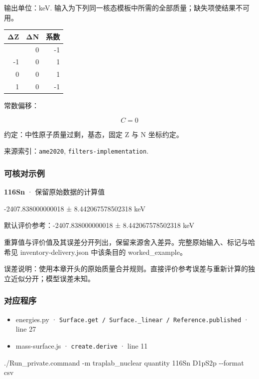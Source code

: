\documentclass[
  11pt,
  letterpaper,
]{article}
\newenvironment{Shaded}{}{}
\newcommand{\AttributeTok}[1]{\textcolor[rgb]{0.49,0.56,0.16}{#1}}
\newcommand{\ExtensionTok}[1]{#1}
\newcommand{\NormalTok}[1]{#1}
\providecommand{\tightlist}{%
  \setlength{\itemsep}{0pt}\setlength{\parskip}{0pt}}
\begin{document}
输出单位：keV.
输入为下列同一核态模板中所需的全部质量；缺失项使结果不可用。

\begin{longtable}[]{@{}rrr@{}}
\toprule\noalign{}
ΔZ & ΔN & 系数 \\
\midrule\noalign{}
\endhead
\bottomrule\noalign{}
\endlastfoot
-2 & 0 & -1 \\
-1 & 0 & 1 \\
0 & 0 & 1 \\
1 & 0 & -1 \\
\end{longtable}

常数偏移：

\[
C=0
\]

约定：中性原子质量过剩，基态，固定 Z 与 N 坐标约定。

来源索引：\texttt{ame2020}, \texttt{filters-implementation}.

\subsubsection{可核对示例}\label{ux53efux6838ux5bf9ux793aux4f8b-31}

\textbf{116Sn} · 保留原始数据的计算值

-2407.838000000018 ± 8.442067578502318 keV

默认评价参考：-2407.838000000018 ± 8.442067578502318 keV

重算值与评价值及其误差分开列出，保留来源舍入差异。完整原始输入、标记与哈希见
inventory-delivery.json 中该条目的 worked\_example。

误差说明：使用本章开头的原始质量合并规则。直接评价参考误差与重新计算的独立近似分开；模型误差未知。

\subsubsection{对应程序}\label{ux5bf9ux5e94ux7a0bux5e8f-31}

\begin{itemize}
\tightlist
\item
  energies.py ·
  \texttt{Surface.get\ /\ Surface.\_linear\ /\ Reference.published} ·
  line 27
\item
  mass-surface.js · \texttt{create.derive} · line 11
\end{itemize}

\begin{Shaded}
\begin{Highlighting}[]
\ExtensionTok{./Run\_private.command} \AttributeTok{{-}m}\NormalTok{ traplab\_nuclear quantity 116Sn D1pS2p }\AttributeTok{{-}{-}format}\NormalTok{ csv}
\end{Highlighting}
\end{Shaded}
\end{document}
